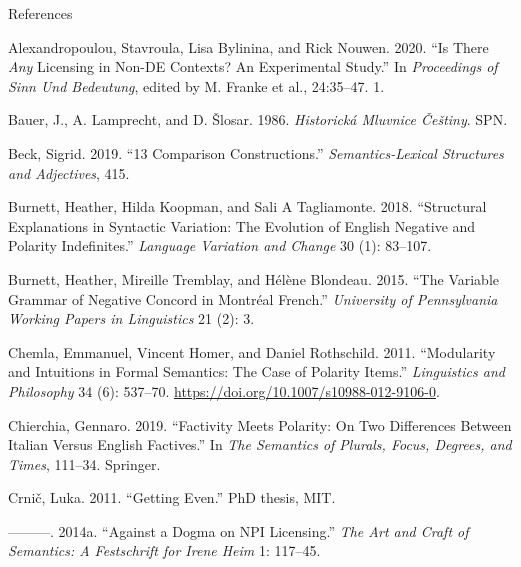 \documentclass[
  ignorenonframetext,
]{beamer}
\newlength{\cslhangindent}
\newlength{\cslentryspacingunit} %
\newenvironment{CSLReferences}[2] %
 {%
  \setlength{\parindent}{0pt}
  \ifodd #1
  \let\oldpar\par
  \def\par{\hangindent=\cslhangindent\oldpar}
  \fi
  \setlength{\parskip}{#2\cslentryspacingunit}
 }%
 {}
\begin{document}
\begin{frame}
\end{frame}

\begin{frame}{References}
\protect\hypertarget{references}{}
\hypertarget{refs}{}
\begin{CSLReferences}{1}{0}
\leavevmode{}%
Alexandropoulou, Stavroula, Lisa Bylinina, and Rick Nouwen. 2020. {``Is
There \emph{Any} Licensing in Non-{DE} Contexts? {A}n Experimental
Study.''} In \emph{Proceedings of Sinn Und Bedeutung}, edited by M.
Franke et al., 24:35--47. 1.

\leavevmode{}%
Bauer, J., A. Lamprecht, and D. Šlosar. 1986. \emph{Historická Mluvnice
Češtiny}. SPN.

\leavevmode{}%
Beck, Sigrid. 2019. {``13 Comparison Constructions.''}
\emph{Semantics-Lexical Structures and Adjectives}, 415.

\leavevmode{}%
Burnett, Heather, Hilda Koopman, and Sali A Tagliamonte. 2018.
{``Structural Explanations in Syntactic Variation: The Evolution of
English Negative and Polarity Indefinites.''} \emph{Language Variation
and Change} 30 (1): 83--107.

\leavevmode{}%
Burnett, Heather, Mireille Tremblay, and Hélène Blondeau. 2015. {``The
Variable Grammar of Negative Concord in Montr{é}al French.''}
\emph{University of Pennsylvania Working Papers in Linguistics} 21 (2):
3.

\leavevmode{}%
Chemla, Emmanuel, Vincent Homer, and Daniel Rothschild. 2011.
{``Modularity and Intuitions in Formal Semantics: The Case of Polarity
Items.''} \emph{Linguistics and Philosophy} 34 (6): 537--70.
\url{https://doi.org/10.1007/s10988-012-9106-0}.

\leavevmode{}%
Chierchia, Gennaro. 2019. {``Factivity Meets Polarity: On Two
Differences Between {I}talian Versus {E}nglish Factives.''} In \emph{The
Semantics of Plurals, Focus, Degrees, and Times}, 111--34. Springer.

\leavevmode{}%
Crnič, Luka. 2011. {``Getting Even.''} PhD thesis, MIT.

\leavevmode{}%
---------. 2014a. {``Against a Dogma on NPI Licensing.''} \emph{The Art
and Craft of Semantics: A Festschrift for Irene Heim} 1: 117--45.


\end{CSLReferences}
\end{frame}
\end{document}
